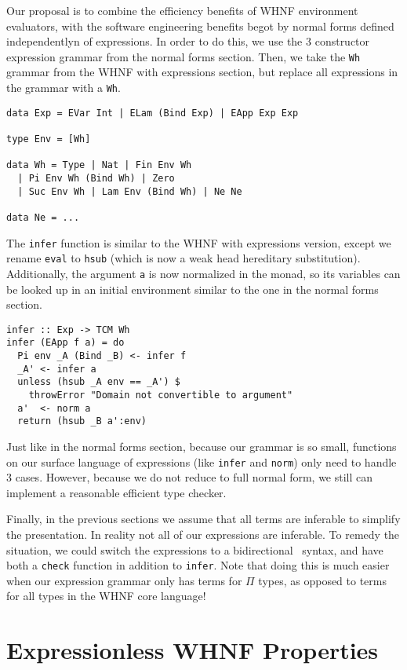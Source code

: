 \documentclass[preprint,authoryear]{sigplanconf}
\begin{document}
Our proposal is to combine the efficiency benefits of WHNF environment
evaluators, with the software engineering benefits begot by
normal forms defined independentlyn of expressions. In order to do
this, we use the 3 constructor expression grammar from the normal
forms section. Then, we take the \texttt{Wh} grammar from the WHNF
with expressions section, but replace all expressions in the grammar
with a \texttt{Wh}.

\begin{verbatim}
data Exp = EVar Int | ELam (Bind Exp) | EApp Exp Exp

type Env = [Wh]

data Wh = Type | Nat | Fin Env Wh
  | Pi Env Wh (Bind Wh) | Zero
  | Suc Env Wh | Lam Env (Bind Wh) | Ne Ne

data Ne = ...
\end{verbatim}

The \texttt{infer} function is similar to the WHNF with expressions
version, except we rename \texttt{eval} to \texttt{hsub} (which is now a
weak head hereditary substitution). Additionally, the argument
\texttt{a} is now normalized in the monad, so its variables can be
looked up in an initial environment similar to the one in the normal
forms section.

\begin{verbatim}
infer :: Exp -> TCM Wh
infer (EApp f a) = do
  Pi env _A (Bind _B) <- infer f
  _A' <- infer a
  unless (hsub _A env == _A') $
    throwError "Domain not convertible to argument"
  a'  <- norm a
  return (hsub _B a':env)
\end{verbatim}

Just like in the normal forms section, because our grammar is so
small, functions on our surface language of expressions (like
\texttt{infer} and \texttt{norm}) only need to handle 3 cases.
However, because we do not reduce to full normal form, we still can
implement a reasonable efficient type checker.

Finally, in the previous sections we assume that all terms are
inferable to simplify the presentation. In reality not all of our expressions
are inferable. To remedy the situation, we could switch the
expressions to a bidirectional~\cite{TODO} syntax, and have both a \texttt{check}
function in addition to \texttt{infer}. Note that doing this is much
easier when our expression grammar only has terms for $\Pi$ types, as
opposed to terms for all types in the WHNF core language!

\section{Expressionless WHNF Properties}
\end{document}
